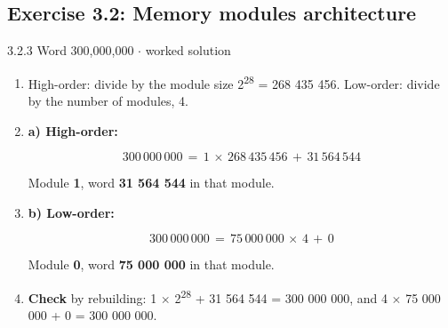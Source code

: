 \documentclass[11pt]{article}
\begin{document}
\begin{keepsection}\subsection{Exercise 3.2: Memory modules architecture}

\begin{workedbox}{3.2.3 Word 300,000,000 \ensuremath{\cdot} worked solution}
\begin{enumerate}
\item High-order: divide by the module size 2\textsuperscript{28} = 268 435 456. Low-order: divide by the number of modules, 4.
\item {}
\textbf{a) High-order:}

\begin{equation*}300\, 000\, 000\, =\, 1\, \times \, 268\, 435\, 456\, +\, 31\, 564\, 544\end{equation*}

Module \textbf{1}, word \textbf{31 564 544} in that module.
\item {}
\textbf{b) Low-order:}

\begin{equation*}300\, 000\, 000\, =\, 75\, 000\, 000\, \times \, 4\, +\, 0\end{equation*}

Module \textbf{0}, word \textbf{75 000 000} in that module.
\item \textbf{Check} by rebuilding: 1 \ensuremath{\times} 2\textsuperscript{28} + 31 564 544 = 300 000 000, and 4 \ensuremath{\times} 75 000 000 + 0 = 300 000 000.
\end{enumerate}
\end{workedbox}

\end{keepsection}
\end{document}
